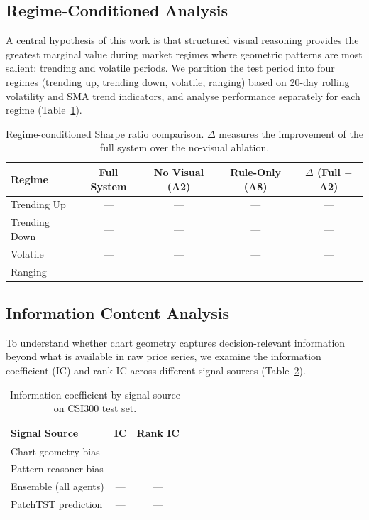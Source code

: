 
\subsection{Regime-Conditioned Analysis}

A central hypothesis of this work is that structured visual reasoning provides the greatest marginal value during market regimes where geometric patterns are most salient: trending and volatile periods. We partition the test period into four regimes (trending up, trending down, volatile, ranging) based on 20-day rolling volatility and SMA trend indicators, and analyse performance separately for each regime (Table~\ref{tab:regime}).

\begin{table}[t]
\centering
\caption{Regime-conditioned Sharpe ratio comparison. $\Delta$ measures the improvement of the full system over the no-visual ablation.}
\label{tab:regime}
\begin{tabular}{lcccc}
\toprule
Regime & Full System & No Visual (A2) & Rule-Only (A8) & $\Delta$ (Full $-$ A2) \\
\midrule
Trending Up    & --- & --- & --- & --- \\
Trending Down  & --- & --- & --- & --- \\
Volatile       & --- & --- & --- & --- \\
Ranging        & --- & --- & --- & --- \\
\bottomrule
\end{tabular}
\end{table}


\subsection{Information Content Analysis}

To understand whether chart geometry captures decision-relevant information beyond what is available in raw price series, we examine the information coefficient (IC) and rank IC across different signal sources (Table~\ref{tab:ic_analysis}).

\begin{table}[t]
\centering
\caption{Information coefficient by signal source on CSI300 test set.}
\label{tab:ic_analysis}
\begin{tabular}{lcc}
\toprule
Signal Source & IC & Rank IC \\
\midrule
Chart geometry bias     & --- & --- \\
Pattern reasoner bias   & --- & --- \\
Ensemble (all agents)   & --- & --- \\
PatchTST prediction     & --- & --- \\
\bottomrule
\end{tabular}
\end{table}

